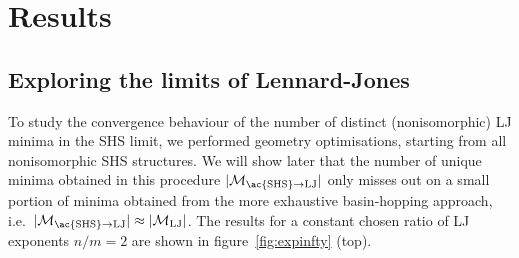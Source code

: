 \section{Results}

\subsection{Exploring the limits of Lennard-Jones}

To study the convergence behaviour of the number of distinct (nonisomorphic) LJ minima in
the \ac{SHS} limit, we performed geometry optimisations,
starting from all nonisomorphic \ac{SHS} structures.  We will show later that the
number of unique minima obtained in this procedure $|\mathcal{M}_\mathrm{\ac{SHS}\to
LJ}|$ only misses out on a small portion of minima obtained from the more exhaustive
basin-hopping approach, i.e.~$|\mathcal{M}_\mathrm{\ac{SHS}\to
LJ}|\approx|\mathcal{M}_\mathrm{LJ}|$.  The results for a constant chosen ratio
of LJ exponents $n/m=2$ are shown in figure~\ref{fig:expinfty} (top). 
